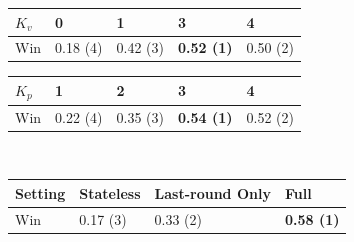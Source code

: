 \documentclass{article}
\begin{document}
\begin{table}[t!]
\vspace{0mm}
\begin{minipage}{0.48\textwidth}
    \centering
    \label{tab:ablation-verifier}
    \vspace{-2mm}
    \begin{tabular}{x{45pt}| x{34pt} x{34pt} x{34pt} x{34pt}}\toprule
    $K_v$ & 0 & 1 &  3 & 4 \\\midrule
    Win 
    & 0.18 (4) 
    & 0.42 (3) 
    &  \textbf{0.52 (1)} 
    & 0.50 (2) \\
    \bottomrule
    \end{tabular}
\end{minipage}
\hspace{1.5mm}
\begin{minipage}{0.48\textwidth}
    \centering
    \label{tab:ablation-proposer}
    \vspace{-2mm}
    \begin{tabular}{x{45pt}| x{34pt} x{34pt} x{34pt} x{34pt}}\toprule
    $K_p$ & 1 & 2 &  3 & 4 \\\midrule
    Win 
    & 0.22 (4) 
    & 0.35 (3) 
    &  \textbf{0.54 (1)} 
    & 0.52 (2) \\
    \bottomrule
    \end{tabular}
\end{minipage}
\\
\vspace{0mm}
\begin{minipage}{0.48\textwidth}
    \centering
    \label{tab:ablation-memory}
    \vspace{-2mm}
    \begin{tabular}{x{40pt}| x{34pt} x{60pt} x{34pt}}\toprule
    Setting 
    & Stateless 
    & Last-round Only 
    &  Full \\\midrule
    Win 
    & 0.17 (3) 
    & 0.33 (2) 
    &  \textbf{0.58 (1)} \\

\end{tabular}
\end{minipage}
\end{table}
\end{document}
